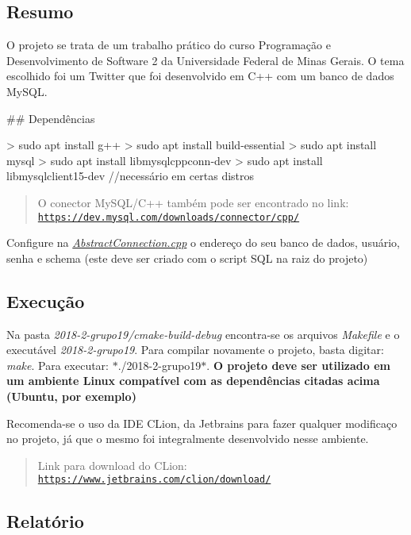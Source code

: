 \subsection*{Resumo}

O projeto se trata de um trabalho prático do curso Programação e Desenvolvimento de Software 2 da Universidade Federal de Minas Gerais. O tema escolhido foi um Twitter que foi desenvolvido em C++ com um banco de dados My\+S\+QL.

\#\# Dependências 
\begin{DoxyCode}
> sudo apt install g++
> sudo apt install build-essential
> sudo apt install mysql
> sudo apt install libmysqlcppconn-dev
> sudo apt install libmysqlclient15-dev //necessário em certas distros
\end{DoxyCode}
 \begin{quote}
O conector My\+S\+Q\+L/\+C++ também pode ser encontrado no link\+: \href{https://dev.mysql.com/downloads/connector/cpp/}{\tt https\+://dev.\+mysql.\+com/downloads/connector/cpp/} \end{quote}


Configure na {\itshape \hyperlink{_abstract_connection_8cpp}{Abstract\+Connection.\+cpp}} o endereço do seu banco de dados, usuário, senha e schema (este deve ser criado com o script S\+QL na raiz do projeto)

\subsection*{Execução}

Na pasta {\itshape 2018-\/2-\/grupo19/cmake-\/build-\/debug} encontra-\/se os arquivos {\itshape Makefile} e o executável {\itshape 2018-\/2-\/grupo19}. Para compilar novamente o projeto, basta digitar\+: {\itshape make}. Para executar\+: $\ast$./2018-\/2-\/grupo19$\ast$. {\bfseries O projeto deve ser utilizado em um ambiente Linux compatível com as dependências citadas acima (Ubuntu, por exemplo)}

Recomenda-\/se o uso da I\+DE C\+Lion, da Jetbrains para fazer qualquer modificaço no projeto, já que o mesmo foi integralmente desenvolvido nesse ambiente. \begin{quote}
Link para download do C\+Lion\+: \href{https://www.jetbrains.com/clion/download/}{\tt https\+://www.\+jetbrains.\+com/clion/download/} \end{quote}


\subsection*{Relatório}

